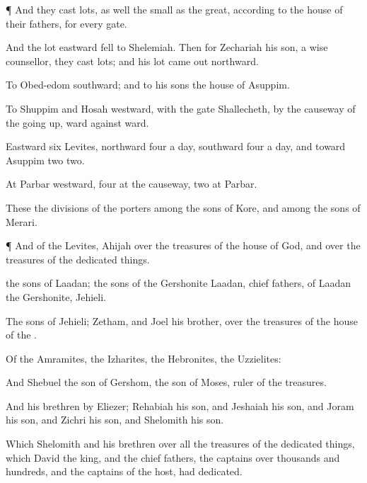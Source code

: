 {\par }{\PP {}¶ And they
cast
lots, as well the
small as the
great, according to the
house of their
fathers, for every
gate.

And the
lot
eastward
fell to
Shelemiah. Then for
Zechariah his
son, a
wise
counsellor, they
cast
lots; and his
lot came
out
northward.

To
Obed-edom
southward; and to his
sons the
house of
Asuppim.

To
Shuppim and
Hosah
{}
westward, with the
gate
Shallecheth, by the
causeway of the going
up,
ward
against
ward.

Eastward
{}
six
Levites,
northward
four a
day,
southward
four a
day, and toward
Asuppim
two
{}
two.

At
Parbar
westward,
four at the
causeway,
{}
two at
Parbar.

These
{} the
divisions of the
porters among the
sons of
Kore, and among the
sons of
Merari.


\par }{\PP {}¶ And of the
Levites,
Ahijah
{} over the
treasures of the
house of
God, and over the
treasures of the dedicated
things.

 the
sons of
Laadan; the
sons of the
Gershonite
Laadan,
chief
fathers,
{} of
Laadan the
Gershonite,
{}
Jehieli.

The
sons of
Jehieli;
Zetham, and
Joel his
brother,
{} over the
treasures of the
house of the
{}.

Of the
Amramites,
{} the
Izharites, the
Hebronites,
{} the
Uzzielites:

And
Shebuel the
son of
Gershom, the
son of
Moses,
{}
ruler of the
treasures.

And his
brethren by
Eliezer;
Rehabiah his
son, and
Jeshaiah his
son, and
Joram his
son, and
Zichri his
son, and
Shelomith his
son.

Which
Shelomith and his
brethren
{} over all the
treasures of the dedicated
things, which
David the
king, and the
chief
fathers, the
captains over
thousands and
hundreds, and the
captains of the
host, had
dedicated.

}
